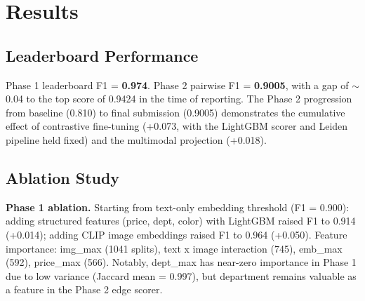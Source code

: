 \documentclass[10pt,twocolumn,a4paper]{article}
\begin{document}
\begin{table}[htb]
\caption{Results across both phases. Phase 1 metrics from 5-fold CV (rows 1-3) and leaderboard (row 4). Phase 2 metrics 
from the competition server. P/R unavailable for server-evaluated submissions.}
\vspace{0.5em}
\centering
{}
\end{table}

\section{Results}

\subsection{Leaderboard Performance}
Phase 1 leaderboard F1 = \textbf{0.974}. Phase 2 pairwise F1 = \textbf{0.9005}, with a gap of $\sim$0.04 to the top score of 
0.9424 in the time of reporting. The Phase 2 progression from baseline (0.810) to final submission (0.9005) demonstrates the
cumulative effect of contrastive fine-tuning (+0.073, with the LightGBM scorer and Leiden pipeline held fixed)
and the multimodal projection (+0.018).

\subsection{Ablation Study}
\textbf{Phase 1 ablation.} Starting from text-only embedding threshold (F1 = 0.900): adding structured features (price, dept, color) 
with LightGBM raised F1 to 0.914 (+0.014); adding CLIP image embeddings raised F1 to 0.964 (+0.050). Feature importance: 
img\_max (1041 splits), text x image interaction (745), emb\_max (592), price\_max (566). Notably, dept\_max has near-zero 
importance in Phase 1 due to low variance (Jaccard mean = 0.997), but department remains valuable as a feature in the Phase 2 
edge scorer.
\end{document}
